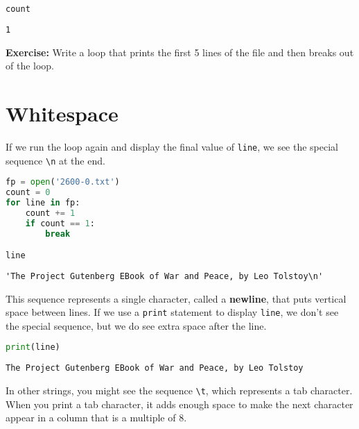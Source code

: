 \begin{lstlisting}[language=Python,style=source]
count
\end{lstlisting}

\begin{lstlisting}[style=output]
1
\end{lstlisting}

\textbf{Exercise:} Write a loop that prints the first 5 lines of the
file and then breaks out of the loop.

\section{Whitespace}\label{whitespace}

If we run the loop again and display the final value of
\passthrough{\lstinline!line!}, we see the special sequence
\passthrough{\lstinline!\\n!} at the end.

\begin{lstlisting}[language=Python,style=source]
fp = open('2600-0.txt')
count = 0
for line in fp:
    count += 1
    if count == 1:
        break

line
\end{lstlisting}

\begin{lstlisting}[style=output]
'The Project Gutenberg EBook of War and Peace, by Leo Tolstoy\n'
\end{lstlisting}

This sequence represents a single character, called a \textbf{newline},
that puts vertical space between lines. If we use a
\passthrough{\lstinline!print!} statement to display
\passthrough{\lstinline!line!}, we don't see the special sequence, but
we do see extra space after the line.

\begin{lstlisting}[language=Python,style=source]
print(line)
\end{lstlisting}

\begin{lstlisting}[style=output]
The Project Gutenberg EBook of War and Peace, by Leo Tolstoy

\end{lstlisting}

In other strings, you might see the sequence
\passthrough{\lstinline!\\t!}, which represents a tab character. When
you print a tab character, it adds enough space to make the next
character appear in a column that is a multiple of 8.

